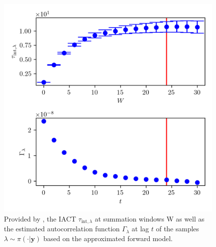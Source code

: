\begin{figure}[ht!]
	\centering
	\includegraphics{UwerrTauIntSecO3lam.png}
	\caption[IACT and autocorrelation of samples $\lambda \sim \pi( \cdot | \bm{y})$, for approximated model.]{Provided by \cite{drikHesse}, the IACT $\tau_{\text{int},\lambda}$ at summation windows W as well as the estimated autocorrelation function $\Gamma_{\lambda}$ at lag $t$ of the samples $\lambda \sim \pi( \cdot | \bm{y})$ based on the approximated forward model.}
	\label{fig:IATCSecO3lam}
\end{figure}
